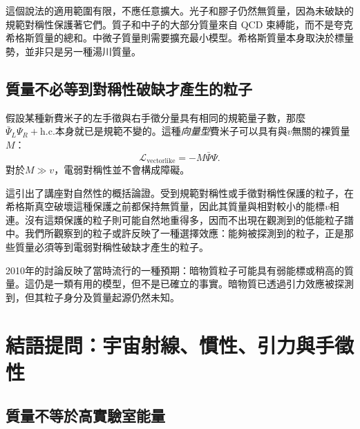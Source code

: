 這個說法的適用範圍有限，不應任意擴大。光子和膠子仍然無質量，因為未破缺的規範對稱性保護著它們。質子和中子的大部分質量來自 QCD 束縛能，而不是夸克希格斯質量的總和。中微子質量則需要擴充最小模型。希格斯質量本身取決於標量勢，並非只是另一種湯川質量。

\subsection{質量不必等到對稱性破缺才產生的粒子}

假設某種新費米子的左手徵與右手徵分量具有相同的規範量子數，那麼
\(\bar\Psi_L\Psi_R+\mathrm{h.c.}\)本身就已是規範不變的。這種\emph{向量型}費米子可以具有與\(v\)無關的裸質量\(M\)：
\begin{equation}
  \mathcal L_{\mathrm{vectorlike}}
  =-M\bar\Psi\Psi.
  \label{eq:l09-vectorlike-mass}
\end{equation}
對於\(M\gg v\)，電弱對稱性並不會構成障礙。

這引出了講座對自然性的概括論證。受到規範對稱性或手徵對稱性保護的粒子，在希格斯真空破壞這種保護之前都保持無質量，因此其質量與相對較小的能標\(v\)相連。沒有這類保護的粒子則可能自然地重得多，因而不出現在觀測到的低能粒子譜中。我們所觀察到的粒子或許反映了一種選擇效應：能夠被探測到的粒子，正是那些質量必須等到電弱對稱性破缺才產生的粒子。

\begin{classroomqa}
\end{classroomqa}

2010年的討論反映了當時流行的一種預期：暗物質粒子可能具有弱能標或稍高的質量。這仍是一類有用的模型，但不是已確立的事實。暗物質已透過引力效應被探測到，但其粒子身分及質量起源仍然未知。

\section{結語提問：宇宙射線、慣性、引力與手徵性}

\subsection{質量不等於高實驗室能量}

\begin{classroomqa}
\end{classroomqa}


